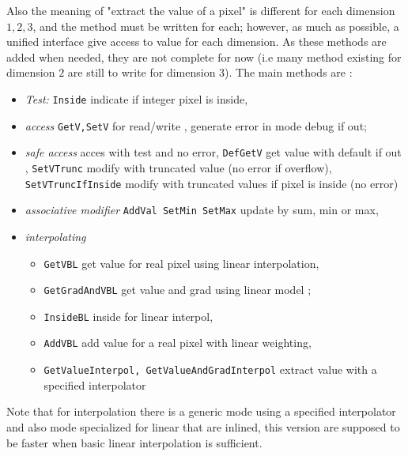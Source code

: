 Also the meaning of "extract the value of a pixel"  is different for each dimension $1,2,3$,
and the method must be written for each; however, as much as possible, a unified interface 
give access to value for each dimension.  As these methods are added when needed, they are not
complete for now (i.e many method existing for dimension $2$ are still to write for dimension $3$).
The main methods are :

\begin{itemize}
    \item  \emph{Test:} {\tt Inside} indicate if integer pixel is inside, 

    \item  \emph{access} {\tt GetV,SetV}  for read/write   ,  generate error in mode
           debug if out;

    \item  \emph{safe access} acces with test and no error, {\tt DefGetV} get value with default if out ,
           {\tt SetVTrunc}  modify with truncated value (no error if overflow),
           {\tt SetVTruncIfInside}  modify with truncated values if pixel is inside (no error)

    \item \emph{associative modifier}  {\tt AddVal SetMin SetMax}  update by sum, min or max,


    \item \emph{interpolating}  
      \begin{itemize}
           \item {\tt GetVBL} get value for real pixel using linear interpolation,
           \item {\tt GetGradAndVBL} get value and grad using linear model ;
           \item {\tt InsideBL} inside for linear interpol,
           \item {\tt AddVBL} add value for a real pixel with linear weighting,
           \item {\tt GetValueInterpol, GetValueAndGradInterpol} extract value with a specified interpolator
      \end{itemize}

\end{itemize}

Note that for interpolation there is a generic mode using a specified interpolator and also mode
specialized for linear that are inlined, this version are supposed to be faster when basic linear 
interpolation is sufficient.

